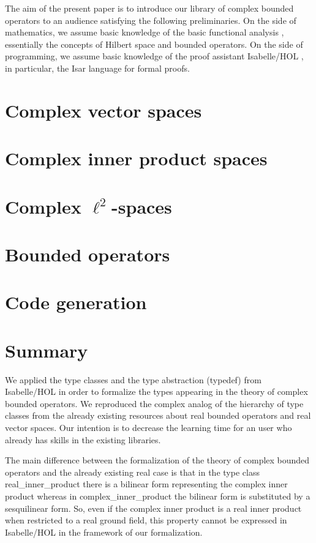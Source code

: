 \documentclass[12pt]{article}
\theoremstyle{definition}
\begin{document}
The aim of the present paper is to introduce our library of complex bounded operators to an audience satisfying the following preliminaries. On the side of mathematics, we assume basic knowledge of the basic functional analysis \cite{conway2019course}, essentially the concepts of Hilbert space and bounded operators. On the side of programming, we assume basic knowledge of the proof assistant Isabelle/HOL \cite{nipkow2002isabelle}, in particular, the Isar language for formal proofs.

\section{Complex vector spaces}
\blindtext[6]

\section{Complex inner product spaces}
\blindtext[6]

\section{Complex $\ell^2$-spaces}
\blindtext[6]

\section{Bounded operators}
\blindtext[6]

\section{Code generation}
\blindtext[6]


\section{Summary}
We applied the type classes and the type abstraction (typedef) from Isabelle/HOL in order to formalize the types appearing in the theory of complex bounded operators. We reproduced the complex analog of the hierarchy of type classes from the already existing resources about real bounded operators and real vector spaces. Our intention is to decrease the learning time for an user who already has skills in the existing libraries.

The main difference between the formalization of the theory of complex bounded operators and the already existing real case is that in the type class \textsf{real\_inner\_product} there is a bilinear form representing the complex inner product whereas in \textsf{complex\_inner\_product}  the bilinear form is substituted by a sesquilinear form. So, even if the complex inner product is a real inner product when restricted to a real ground field, this property cannot be expressed in Isabelle/HOL in the framework of our formalization.
\end{document}
